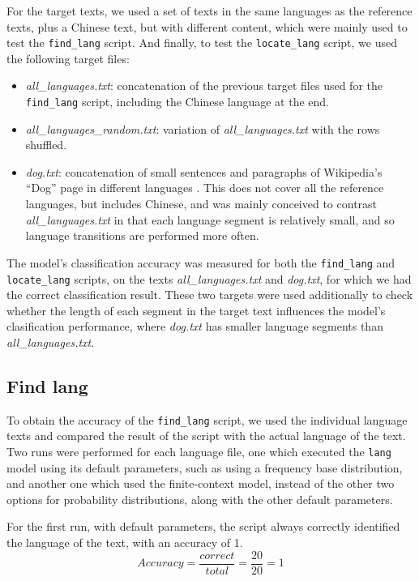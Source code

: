 \documentclass{article}
\begin{document}
For the target texts, we used a set of texts in the same languages as the reference texts, plus a Chinese text, but with different content, which were mainly used to test the \texttt{find_lang} script.
And finally, to test the \texttt{locate_lang} script, we used the following target files:

\begin{itemize}
    \item \textit{all\_languages.txt}: concatenation of the previous target files used for the \texttt{find_lang} script, including the Chinese language at the end.
    \item \textit{all\_languages\_random.txt}: variation of \textit{all_languages.txt} with the rows shuffled.
    \item \textit{dog.txt}: concatenation of small sentences and paragraphs of Wikipedia's ``Dog'' page in different languages \cite{wiki:dog}. This does not cover all the reference languages, but includes Chinese, and was mainly conceived to contrast \textit{all\_languages.txt} in that each language segment is relatively small, and so language transitions are performed more often.
\end{itemize}

The model's classification accuracy was measured for both the \texttt{find_lang} and \texttt{locate_lang} scripts, on the texts \textit{all\_languages.txt} and \textit{dog.txt}, for which we had the correct classification result.
These two targets were used additionally to check whether the length of each segment in the target text influences the model's clasification performance, where \textit{dog.txt} has smaller language segments than \textit{all\_languages.txt}.

\subsection{Find lang}
\label{subsec:results_find_lang}

To obtain the accuracy of the \texttt{find_lang} script, we used the individual language texts and compared the result of the script with the actual language of the text.
Two runs were performed for each language file, one which executed the \texttt{lang} model using its default parameters, such as using a frequency base distribution,
and another one which used the finite-context model, instead of the other two options for probability distributions, along with the other default parameters.

For the first run, with default parameters, the script always correctly identified the language of the text, with an accuracy of 1.
\begin{equation}
    \label{eq:find_lang_default_accuracy}
    Accuracy = \frac{correct}{total} = \frac{20}{20} = 1
\end{equation}
\end{document}
